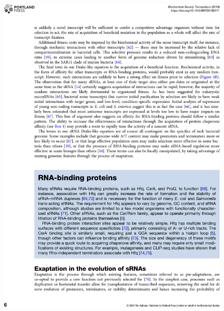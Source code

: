 \begin{figure}
    \centering
    \includegraphics[width=\linewidth]{lit_review/page6.png}
\end{figure}
